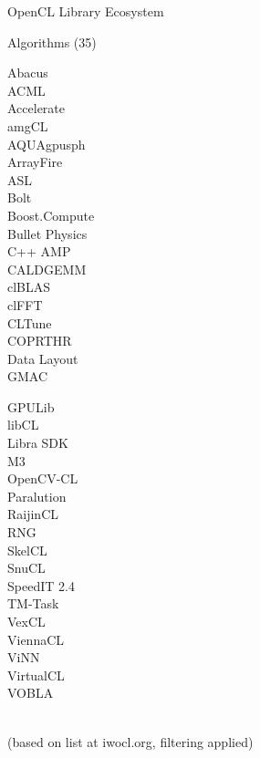 \begin{frame}{OpenCL Library Ecosystem}
\begin{minipage}{0.49\textwidth}
 \end{minipage}
 \begin{minipage}{0.49\textwidth}
 \begin{block}{Algorithms (35)}\end{block}
 \begin{minipage}{0.49\textwidth}
Abacus\\
ACML\\
Accelerate\\
amgCL\\
AQUAgpusph\\
ArrayFire\\
ASL\\
Bolt\\
Boost.Compute\\
Bullet Physics\\
C++ AMP\\
CALDGEMM\\
clBLAS\\
clFFT\\
CLTune\\
COPRTHR\\
Data Layout\\
GMAC\\
 \end{minipage}
  \begin{minipage}{0.49\textwidth}
GPULib\\
libCL\\
Libra SDK\\
M3\\
OpenCV-CL\\
Paralution\\
RaijinCL\\
RNG\\
SkelCL\\
SnuCL\\
SpeedIT 2.4\\
TM-Task\\
VexCL\\
ViennaCL\\
ViNN\\
VirtualCL\\
VOBLA\\
 \\
 \end{minipage}
    
 \end{minipage}

 \begin{center}
 \vspace*{-.5cm} \scriptsize (based on list at iwocl.org, filtering applied)
 \end{center}

\end{frame}


